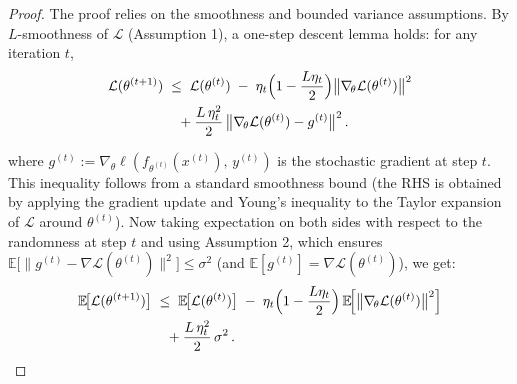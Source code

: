 \documentclass{article} %
\begin{document}
\begin{proof}
The proof relies on the smoothness and bounded variance assumptions. By $L$-smoothness of $\mathcal{L}$ (Assumption 1), a one-step descent lemma holds: for any iteration $t$,
\begin{equation}
\begin{aligned}
\mathcal{L}(\theta^{(t+1)}) 
&\;\le\; \mathcal{L}(\theta^{(t)}) 
\;-\; \eta_t\Bigl(1 - \frac{L\eta_t}{2}\Bigr) \bigl\|\nabla_{\!\theta}\mathcal{L}(\theta^{(t)})\bigr\|^2 \\
&\quad + \frac{L\,\eta_t^2}{2}\,\bigl\|\nabla_{\!\theta}\mathcal{L}(\theta^{(t)}) - g^{(t)}\bigr\|^2\,.
\end{aligned}
\end{equation}

where $g^{(t)} := \nabla_{\!\theta}\ell(f_{\theta^{(t)}}(x^{(t)}),\,y^{(t)})$ is the stochastic gradient at step $t$. This inequality follows from a standard smoothness bound (the RHS is obtained by applying the gradient update and Young's inequality to the Taylor expansion of $\mathcal{L}$ around $\theta^{(t)}$). Now taking expectation on both sides with respect to the randomness at step $t$ and using Assumption 2, which ensures $\mathbb{E}\!\big[\|g^{(t)} - \nabla \mathcal{L}(\theta^{(t)})\|^2\big] \le \sigma^2$ (and $\mathbb{E}[g^{(t)}] = \nabla \mathcal{L}(\theta^{(t)})$), we get:
\begin{equation}
\begin{aligned}
\mathbb{E}\!\big[\mathcal{L}(\theta^{(t+1)})\big]
&\;\le\; \mathbb{E}\!\big[\mathcal{L}(\theta^{(t)})\big]
\;-\; \eta_t\Bigl(1 - \frac{L\eta_t}{2}\Bigr)\,\mathbb{E}\!\Big[\bigl\|\nabla_{\!\theta}\mathcal{L}(\theta^{(t)})\bigr\|^2\Big] \\
&\quad + \frac{L\,\eta_t^2}{2}\,\sigma^2\,.
\end{aligned}
\end{equation}



\end{proof}
\end{document}
